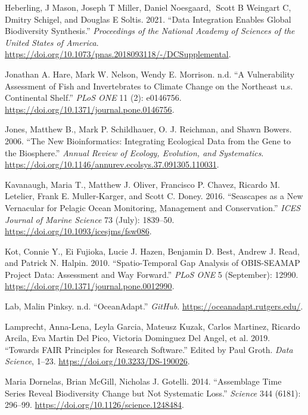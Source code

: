 \documentclass[
]{book}
\newlength{\cslhangindent}
\newlength{\cslentryspacingunit} %
\newenvironment{CSLReferences}[2] %
 {%
  \setlength{\parindent}{0pt}
  \ifodd #1
  \let\oldpar\par
  \def\par{\hangindent=\cslhangindent\oldpar}
  \fi
  \setlength{\parskip}{#2\cslentryspacingunit}
 }%
 {}
\begin{document}
\begin{CSLReferences}{1}{0}
\leavevmode{}%
Heberling, J Mason, Joseph T Miller, Daniel Noesgaard, Scott B Weingart C, Dmitry Schigel, and Douglas E Soltis. 2021. {``Data Integration Enables Global Biodiversity Synthesis.''} \emph{Proceedings of the National Academy of Sciences of the United States of America}. \url{https://doi.org/10.1073/pnas.2018093118/-/DCSupplemental}.

\leavevmode{}%
Jonathan A. Hare, Mark W. Nelson, Wendy E. Morrison. n.d. {``A Vulnerability Assessment of Fish and Invertebrates to Climate Change on the Northeast u.s. Continental Shelf.''} \emph{PLoS ONE} 11 (2): e0146756. \url{https://doi.org/10.1371/journal.pone.0146756}.

\leavevmode{}%
Jones, Matthew B., Mark P. Schildhauer, O. J. Reichman, and Shawn Bowers. 2006. {``The New Bioinformatics: Integrating Ecological Data from the Gene to the Biosphere.''} \emph{Annual Review of Ecology, Evolution, and Systematics}. \url{https://doi.org/10.1146/annurev.ecolsys.37.091305.110031}.

\leavevmode{}%
Kavanaugh, Maria T., Matthew J. Oliver, Francisco P. Chavez, Ricardo M. Letelier, Frank E. Muller-Karger, and Scott C. Doney. 2016. {``Seascapes as a New Vernacular for Pelagic Ocean Monitoring, Management and Conservation.''} \emph{ICES Journal of Marine Science} 73 (July): 1839--50. \url{https://doi.org/10.1093/icesjms/fsw086}.

\leavevmode{}%
Kot, Connie Y., Ei Fujioka, Lucie J. Hazen, Benjamin D. Best, Andrew J. Read, and Patrick N. Halpin. 2010. {``Spatio-Temporal Gap Analysis of OBIS-SEAMAP Project Data: Assessment and Way Forward.''} \emph{PLoS ONE} 5 (September): 12990. \url{https://doi.org/10.1371/journal.pone.0012990}.

\leavevmode{}%
Lab, Malin Pinksy. n.d. {``OceanAdapt.''} \emph{GitHub}. \url{https://oceanadapt.rutgers.edu/}.

\leavevmode{}%
Lamprecht, Anna-Lena, Leyla Garcia, Mateusz Kuzak, Carlos Martinez, Ricardo Arcila, Eva Martin Del Pico, Victoria Dominguez Del Angel, et al. 2019. {``Towards FAIR Principles for Research Software.''} Edited by Paul Groth. \emph{Data Science}, 1--23. \url{https://doi.org/10.3233/DS-190026}.

\leavevmode{}%
Maria Dornelas, Brian McGill, Nicholas J. Gotelli. 2014. {``Assemblage Time Series Reveal Biodiversity Change but Not Systematic Loss.''} \emph{Science} 344 (6181): 296--99. \url{https://doi.org/10.1126/science.1248484}.


\end{CSLReferences}
\end{document}

